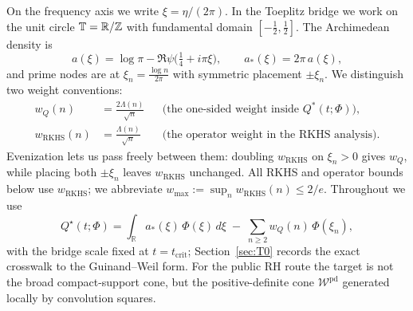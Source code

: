 On the frequency axis we write $\xi=\eta/(2\pi)$. In the Toeplitz bridge we work on the unit circle
\(\mathbb T=\mathbb R/\mathbb Z\) with fundamental domain $[-\tfrac12,\tfrac12]$. The Archimedean density is
\[
  a(\xi)=\log\pi-\Re\psi\Big(\tfrac14+i\pi\xi\Big),\qquad a_*(\xi)=2\pi\,a(\xi),
\]
and prime nodes are at $\xi_n=\tfrac{\log n}{2\pi}$ with symmetric placement $\pm\xi_n$. We distinguish two weight conventions:
\[
\begin{aligned}
  w_Q(n) &= \frac{2\Lambda(n)}{\sqrt{n}}
  &&\text{(the one-sided weight inside $Q^\ast(t;\Phi)$)}, \\
  w_{\mathrm{RKHS}}(n) &= \frac{\Lambda(n)}{\sqrt{n}}
  &&\text{(the operator weight in the RKHS analysis)}.
\end{aligned}
\]
Evenization lets us pass freely between them: doubling $w_{\mathrm{RKHS}}$ on $\xi_n>0$ gives $w_Q$, while placing both $\pm\xi_n$ leaves $w_{\mathrm{RKHS}}$ unchanged. All RKHS and operator bounds below use $w_{\mathrm{RKHS}}$; we abbreviate $w_{\max}:=\sup_n w_{\mathrm{RKHS}}(n)\le 2/e$. Throughout we use
\[
  Q^\star(t;\Phi)=\int_{\mathbb{R}} a_*(\xi)\,\Phi(\xi)\,d\xi\;-\;\sum_{n\ge2} w_Q(n)\,\Phi(\xi_n),
\]
with the bridge scale fixed at $t=t_{\mathrm{crit}}$; Section~\ref{sec:T0} records the exact crosswalk to the Guinand--Weil form. For the public RH route the target is not the broad compact-support cone, but the positive-definite cone $\mathcal W^{\mathrm{pd}}$ generated locally by convolution squares.

